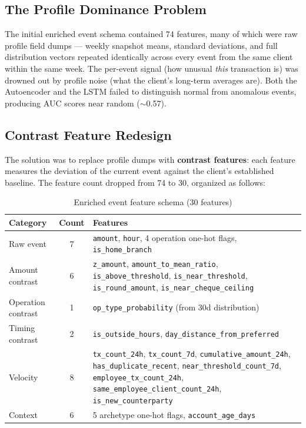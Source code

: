 \subsection{The Profile Dominance Problem}

The initial enriched event schema contained 74 features, many of which were raw
profile field dumps --- weekly snapshot means, standard deviations, and full
distribution vectors repeated identically across every event from the same client
within the same week. The per-event signal (how unusual \textit{this} transaction is)
was drowned out by profile noise (what the client's long-term averages are). Both the
Autoencoder and the LSTM failed to distinguish normal from anomalous events, producing
AUC scores near random ($\sim$0.57).

\subsection{Contrast Feature Redesign}

The solution was to replace profile dumps with \textbf{contrast features}: each
feature measures the deviation of the current event against the client's established
baseline. The feature count dropped from 74 to 30, organized as follows:

\begin{table}[H]
\centering
\caption{Enriched event feature schema (30 features)}
\label{tab:enriched-features}
\begin{tabular}{@{}p{3.5cm}cp{7.5cm}@{}}
\toprule
\textbf{Category} & \textbf{Count} & \textbf{Features} \\
\midrule
Raw event        & 7  & \texttt{amount}, \texttt{hour}, 4 operation one-hot flags,
                        \texttt{is\_home\_branch} \\
Amount contrast  & 6  & \texttt{z\_amount}, \texttt{amount\_to\_mean\_ratio},
                        \texttt{is\_above\_threshold}, \texttt{is\_near\_threshold},
                        \texttt{is\_round\_amount}, \texttt{is\_near\_cheque\_ceiling} \\
Operation contrast & 1 & \texttt{op\_type\_probability} (from 30d distribution) \\
Timing contrast  & 2  & \texttt{is\_outside\_hours},
                        \texttt{day\_distance\_from\_preferred} \\
Velocity         & 8  & \texttt{tx\_count\_24h}, \texttt{tx\_count\_7d},
                        \texttt{cumulative\_amount\_24h},
                        \texttt{has\_duplicate\_recent},
                        \texttt{near\_threshold\_count\_7d},
                        \texttt{employee\_tx\_count\_24h},
                        \texttt{same\_employee\_client\_count\_24h},
                        \texttt{is\_new\_counterparty} \\
Context          & 6  & 5 archetype one-hot flags, \texttt{account\_age\_days} \\
\bottomrule
\end{tabular}
\end{table}

